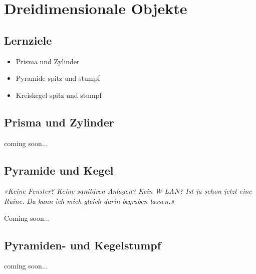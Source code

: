 \section{Dreidimensionale Objekte}
\sectuntertitel{}


\subsection*{Lernziele}
\begin{itemize}
\item Prisma und Zylinder
\item Pyramide spitz und stumpf
\item Kreiskegel spitz und stumpf
\end{itemize}
\newpage

\subsection{Prisma und Zylinder}
coming soon...


\subsection{Pyramide und Kegel}

\begin{center}
{\textit{«Keine Fenster? Keine sanitären Anlagen? Kein W-LAN? Ist ja schon
jetzt eine Ruine. Da kann ich mich gleich darin begraben lassen.»}}
\end{center}

Coming soon...
\newpage

\subsection{Pyramiden- und Kegelstumpf}
coming soon...
\newpage
